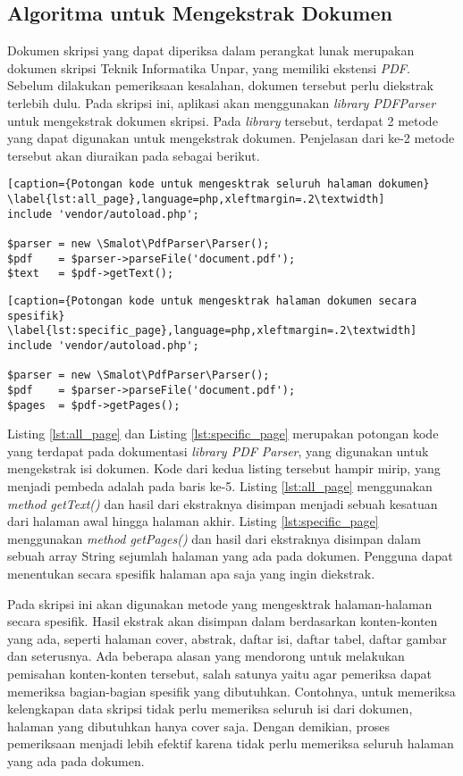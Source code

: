 \subsection{Algoritma untuk Mengekstrak Dokumen}
Dokumen skripsi yang dapat diperiksa dalam perangkat lunak merupakan dokumen skripsi Teknik Informatika Unpar, yang memiliki ekstensi \textit{PDF}. Sebelum dilakukan pemeriksaan kesalahan, dokumen tersebut perlu diekstrak terlebih dulu. Pada skripsi ini, aplikasi akan menggunakan \textit{library PDFParser} untuk mengekstrak dokumen skripsi. Pada \textit{library} tersebut, terdapat 2 metode yang dapat digunakan untuk mengekstrak dokumen. Penjelasan dari ke-2 metode tersebut akan diuraikan pada sebagai berikut.
	
\begin{lstlisting}[caption={Potongan kode untuk mengesktrak seluruh halaman dokumen}	\label{lst:all_page},language=php,xleftmargin=.2\textwidth] 
include 'vendor/autoload.php';
	
$parser = new \Smalot\PdfParser\Parser();
$pdf    = $parser->parseFile('document.pdf');
$text   = $pdf->getText();
\end{lstlisting}
\medskip
	
\begin{lstlisting}[caption={Potongan kode untuk mengesktrak halaman dokumen secara spesifik}
\label{lst:specific_page},language=php,xleftmargin=.2\textwidth] 
include 'vendor/autoload.php';

$parser = new \Smalot\PdfParser\Parser();
$pdf    = $parser->parseFile('document.pdf');
$pages  = $pdf->getPages();
\end{lstlisting}
\medskip

Listing \ref{lst:all_page} dan Listing \ref{lst:specific_page} merupakan potongan kode yang terdapat pada dokumentasi \textit{library PDF Parser}, yang digunakan untuk mengekstrak isi dokumen. Kode dari kedua listing tersebut hampir mirip, yang menjadi pembeda adalah pada baris ke-5. Listing \ref{lst:all_page} menggunakan \textit{method getText()} dan hasil dari ekstraknya disimpan menjadi sebuah kesatuan dari halaman awal hingga halaman akhir. Listing \ref{lst:specific_page} menggunakan \textit{method getPages()} dan hasil dari ekstraknya disimpan dalam sebuah array String sejumlah halaman yang ada pada dokumen. Pengguna dapat menentukan secara spesifik halaman apa saja yang ingin diekstrak.

Pada skripsi ini akan digunakan metode yang mengesktrak halaman-halaman secara spesifik. Hasil ekstrak akan disimpan dalam berdasarkan konten-konten yang ada, seperti halaman cover, abstrak, daftar isi, daftar tabel, daftar gambar dan seterusnya. Ada beberapa alasan yang mendorong untuk melakukan pemisahan konten-konten tersebut, salah satunya yaitu agar pemeriksa dapat memeriksa bagian-bagian spesifik yang dibutuhkan. Contohnya, untuk memeriksa kelengkapan data skripsi tidak perlu memeriksa seluruh isi dari dokumen, halaman yang dibutuhkan hanya cover saja. Dengan demikian, proses pemeriksaan menjadi lebih efektif karena tidak perlu memeriksa seluruh halaman yang ada pada dokumen.

